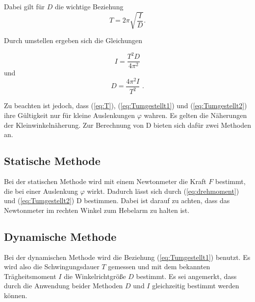 Dabei gilt für $D$ die wichtige Beziehung
\begin{equation} \label{eq:T}
    T = 2\pi \sqrt{\frac{I}{D}} \text{.}
\end{equation}

Durch umstellen ergeben sich die Gleichungen 



\begin{equation}\label{eq:Tumgestellt1}
    I = \frac{T^2D}{4\pi^2}
\end{equation}
und 
\begin{equation}\label{eq:Tumgestellt2}
    D = \frac{4\pi^2I}{T^2} \text{ .}
\end{equation}

Zu beachten ist jedoch, dass (\ref{eq:T}), (\ref{eq:Tumgestellt1}) und (\ref{eq:Tumgestellt2}) ihre Gültigkeit nur für kleine Auslenkungen $\varphi$ wahren.
Es gelten die Näherungen der Kleinwinkelnäherung.
Zur Berechnung von D bieten sich dafür zwei Methoden an.


\subsection{Statische Methode} \label{sec:statmethode}
Bei der statischen Methode wird mit einem Newtonmeter die Kraft $F$ bestimmt, die bei einer Auslenkung $\varphi$ wirkt.
Dadurch lässt sich durch (\ref{eq:drehmoment}) und (\ref{eq:Tumgestellt2}) D bestimmen.
Dabei ist darauf zu achten, dass das Newtonmeter im rechten Winkel zum Hebelarm zu halten ist.

\subsection{Dynamische Methode} \label{sec:dynmethode}
Bei der dynamischen Methode wird die Beziehung (\ref{eq:Tumgestellt1}) benutzt.
Es wird also die Schwingungsdauer $T$ gemessen und mit dem bekannten Trägheitsmoment $I$ die Winkelrichtgröße $D$ bestimmt.
Es sei angemerkt, dass durch die Anwendung beider Methoden $D$ und $I$ gleichzeitig bestimmt werden können.